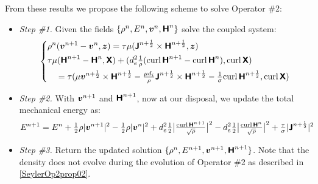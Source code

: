 \documentclass[preprint,1p]{elsarticle}
\begin{document}
From these results we propose the following scheme to solve Operator \#2:
\begin{itemize}
 \item[-] \textit{Step \#1.} Given the fields $\{\rho^n, E^{n},
\boldsymbol{v}^{n}, \boldsymbol{\mathsf{H}}^{n}\}$ solve the coupled system:
\begin{align}
\label{SeylerOp02Scheme}
\left\{
\begin{aligned}
& \rho^n (\vel^{n+1} - \vel^{n}, \veltest) =
\dt \mu (\current^{n+ \frac{1}{2}} \times \Hfield^{n+ \frac{1}{2}}, \veltest) \\
%
& \dt \mu (\Hfield^{n+1} - \Hfield^{n}, \Htest)
+ (d_e^2 \tfrac{1}{\rho} (\curl{}\Hfield^{n+1} - \curl{}\Hfield^{n}),
\curl{}\Htest) \\
%
& \ \ \ = \dt (\mu \vel^{n+ \frac{1}{2}} \times \Hfield^{n+ \frac{1}{2}}
- \tfrac{\mu d_i}{\rho} \current^{n+ \frac{1}{2}} \times \Hfield^{n+
\frac{1}{2}}
- \tfrac{1}{\conduct} \curl{}\Hfield^{n+ \frac{1}{2}} , \curl{}\Htest )
\end{aligned}
\right.
\end{align}
\item[-] \textit{Step \#2.} With $\boldsymbol{v}^{n+1}$ and $\boldsymbol{\mathsf{H}}^{n+1}$, now at our
disposal, we update the total mechanical energy as:
\begin{align*}
E^{n+1}
&=
E^{n}
+ \tfrac{1}{2}\rho |\boldsymbol{v}^{n+1}|^2
- \tfrac{1}{2}\rho |\boldsymbol{v}^{n}|^2
+ d_e^2 \tfrac{1}{2}\big|\tfrac{\text{curl} \, \mathbf{}\boldsymbol{\mathsf{H}}^{n+1}}{\sqrt{\rho}}\big|^2
- d_e^2 \tfrac{1}{2}\big|\tfrac{\text{curl} \, \mathbf{}\boldsymbol{\mathsf{H}}^{n}}{\sqrt{\rho}}\big|^2
+ \tfrac{\tau}{\sigma} |\boldsymbol{\mathsf{J}}^{n+\frac{1}{2}}|^2
\end{align*}
 \item[-] \textit{Step \#3.} Return the updated solution
$\{\rho^n, E^{n+1}, \boldsymbol{v}^{n+1}, \boldsymbol{\mathsf{H}}^{n+1}\}$. Note that the density
does not evolve during the evolution of Operator \#2 as described in
\eqref{SeylerOp2prop02}.
\end{itemize}
\end{document}
